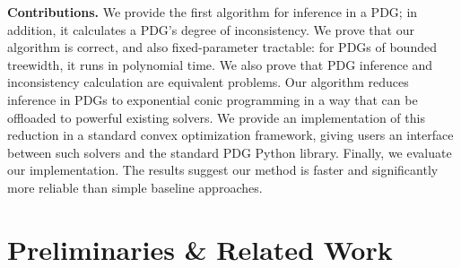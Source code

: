 \textbf{Contributions.}
We provide the first algorithm for inference in a PDG;
in addition, it calculates a PDG's degree of inconsistency. 
We prove that 
our algorithm
is correct, and also
fixed-parameter tractable: for PDGs of bounded treewidth,
it runs in polynomial time.
We also prove that PDG inference and inconsistency 
    calculation are equivalent problems.
Our algorithm reduces inference in PDGs to exponential conic programming
in a way that can be offloaded to powerful existing solvers.
We provide an implementation of this reduction in a
standard convex optimization framework, giving users an
interface between such solvers and the standard PDG Python library.
Finally, we evaluate our implementation. The
    results suggest our method is faster and 
    significantly more reliable than simple baseline approaches.

\section{Preliminaries \& Related Work}

